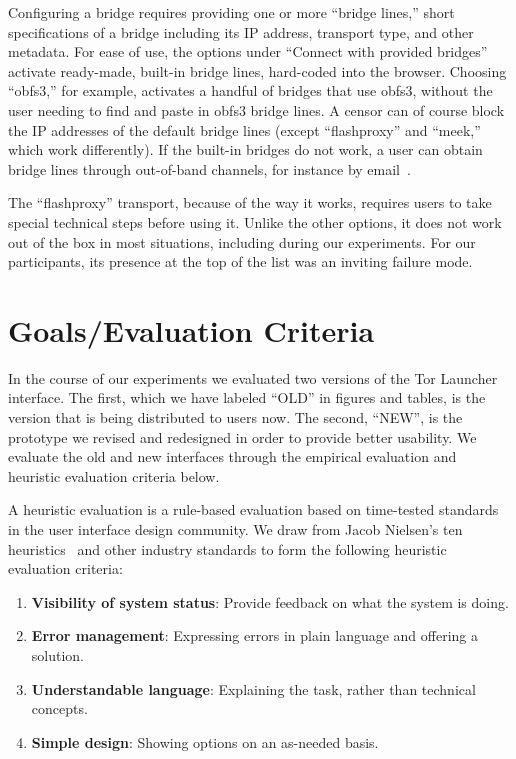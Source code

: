 \documentclass[USenglish,oneside,twocolumn]{article}
\begin{document}
Configuring a bridge requires providing one or more
``bridge lines,'' short specifications of a bridge
including its IP address, transport type, and other metadata.
For ease of use, the options under ``Connect with provided bridges''
activate ready-made, built-in bridge lines,
hard-coded into the browser.
Choosing ``obfs3,'' for example, activates a handful
of bridges that use obfs3, without the user needing
to find and paste in obfs3 bridge lines.
A censor can of course block the IP addresses of the default bridge lines
(except ``flashproxy'' and ``meek,'' which work differently).
If the built-in bridges do not work, a user can obtain bridge lines
through out-of-band channels, for instance by email~\cite{bridgedb}.

The ``flashproxy'' transport, because of the way it works,
requires users to take special technical steps before using it.
Unlike the other options, it does not work out of the box
in most situations, including during our experiments.
For our participants, its presence at the top of the list
was an inviting failure mode.

\section{Goals/Evaluation Criteria}
\label{sec:goals}
In the course of our experiments we evaluated two versions
of the Tor Launcher interface.
The first, which we have labeled ``OLD'' in figures and tables,
is the version that is being distributed to users now.
The second, ``NEW'', is the prototype we revised and redesigned
in order to provide better usability.
We evaluate the old and new interfaces
through the empirical evaluation and heuristic evaluation criteria below. 

A heuristic evaluation is a rule-based evaluation based on time-tested standards
in the user interface design community. We draw from Jacob Nielsen's ten heuristics~\cite{nielsen1994heuristic}
and other industry standards to form the following heuristic evaluation criteria: \\

\begin{enumerate}
    \item  {\bfseries Visibility of system status}: Provide feedback on what the system is doing. 
    \item  {\bfseries Error management}: Expressing errors in plain language and offering a solution. 
    \item  {\bfseries Understandable language}: Explaining the task, rather than technical concepts. 
    \item  {\bfseries Simple design}: Showing options on an as-needed basis. 
\end{enumerate}
\end{document}
